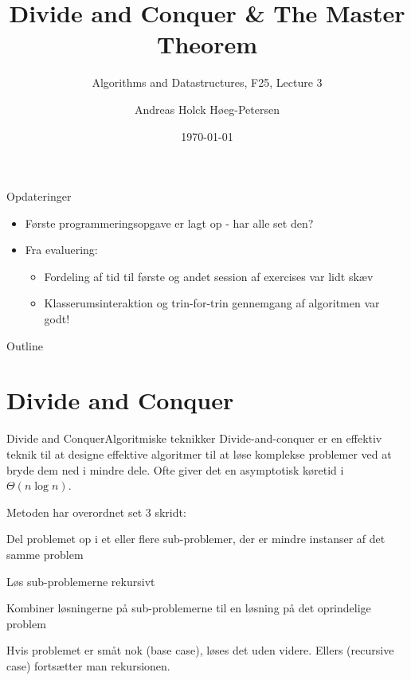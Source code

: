 \documentclass[aspectratio=1610]{beamer}
\title[ALG25 - Lecture 3]
{Divide and Conquer \& The Master Theorem}
\subtitle
{Algorithms and Datastructures, F25, Lecture 3}
\author[Andreas H. Høeg-Petersen]
{Andreas Holck Høeg-Petersen}
\institute[AAU]{%
  Department of Computer Science\\
  Aalborg University
}
\date {\today}
\begin{document}
\begin{frame}
  \titlepage
\end{frame}

\begin{frame}{Opdateringer}{}
    \begin{itemize}
        \item Første programmeringsopgave er lagt op - har alle set den?
        \item Fra evaluering:
            \begin{itemize}
                \item Fordeling af tid til første og andet session af exercises
                    var lidt skæv
                \item Klasserumsinteraktion og trin-for-trin gennemgang af
                    algoritmen var godt!
            \end{itemize}
    \end{itemize}
\end{frame}


\begin{frame}{Outline}
  \tableofcontents
\end{frame}


\section{Divide and Conquer}

\begin{frame}{Divide and Conquer}{Algoritmiske teknikker}
    Divide-and-conquer er en effektiv teknik til at designe effektive
    algoritmer til at løse komplekse problemer ved at bryde dem ned i mindre
    dele. Ofte giver det en asymptotisk køretid i $\Theta(n \log n)$.

    \pause \medskip
    Metoden har overordnet set 3 skridt:

    \pause
    \begin{description}[<+->][Combine]
        \item[Divide] Del problemet op i et eller flere sub-problemer, der er
            mindre instanser af det samme problem
        \item[Conquer] Løs sub-problemerne rekursivt
        \item[Combine] Kombiner løsningerne på sub-problemerne til en løsning på
            det oprindelige problem
    \end{description}

    \pause
    Hvis problemet er småt nok (\alert{base case}), løses det uden videre.
    Ellers (\alert{recursive case}) fortsætter man rekursionen.
\end{frame}
\end{document}
